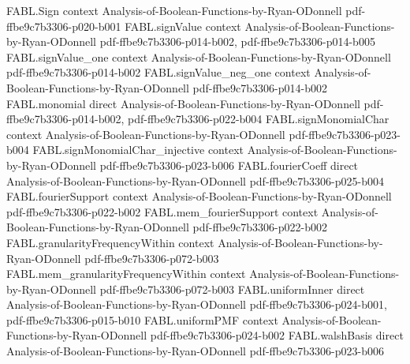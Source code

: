 \begin{theorem}
\label{FABL.correlatedDisagreementProbability_eq}
\leanok
{}
\proofstep
  {FABL.Sign}
  {context}
  {Analysis-of-Boolean-Functions-by-Ryan-ODonnell}
  {pdf-ffbe9c7b3306-p020-b001}
\proofstep
  {FABL.signValue}
  {context}
  {Analysis-of-Boolean-Functions-by-Ryan-ODonnell}
  {pdf-ffbe9c7b3306-p014-b002,
    pdf-ffbe9c7b3306-p014-b005}
\proofstep
  {FABL.signValue_one}
  {context}
  {Analysis-of-Boolean-Functions-by-Ryan-ODonnell}
  {pdf-ffbe9c7b3306-p014-b002}
\proofstep
  {FABL.signValue_neg_one}
  {context}
  {Analysis-of-Boolean-Functions-by-Ryan-ODonnell}
  {pdf-ffbe9c7b3306-p014-b002}
\proofstep
  {FABL.monomial}
  {direct}
  {Analysis-of-Boolean-Functions-by-Ryan-ODonnell}
  {pdf-ffbe9c7b3306-p014-b002,
    pdf-ffbe9c7b3306-p022-b004}
\proofstep
  {FABL.signMonomialChar}
  {context}
  {Analysis-of-Boolean-Functions-by-Ryan-ODonnell}
  {pdf-ffbe9c7b3306-p023-b004}
\proofstep
  {FABL.signMonomialChar_injective}
  {context}
  {Analysis-of-Boolean-Functions-by-Ryan-ODonnell}
  {pdf-ffbe9c7b3306-p023-b006}
\proofstep
  {FABL.fourierCoeff}
  {direct}
  {Analysis-of-Boolean-Functions-by-Ryan-ODonnell}
  {pdf-ffbe9c7b3306-p025-b004}
\proofstep
  {FABL.fourierSupport}
  {context}
  {Analysis-of-Boolean-Functions-by-Ryan-ODonnell}
  {pdf-ffbe9c7b3306-p022-b002}
\proofstep
  {FABL.mem_fourierSupport}
  {context}
  {Analysis-of-Boolean-Functions-by-Ryan-ODonnell}
  {pdf-ffbe9c7b3306-p022-b002}
\proofstep
  {FABL.granularityFrequencyWithin}
  {context}
  {Analysis-of-Boolean-Functions-by-Ryan-ODonnell}
  {pdf-ffbe9c7b3306-p072-b003}
\proofstep
  {FABL.mem_granularityFrequencyWithin}
  {context}
  {Analysis-of-Boolean-Functions-by-Ryan-ODonnell}
  {pdf-ffbe9c7b3306-p072-b003}
\proofstep
  {FABL.uniformInner}
  {direct}
  {Analysis-of-Boolean-Functions-by-Ryan-ODonnell}
  {pdf-ffbe9c7b3306-p024-b001,
    pdf-ffbe9c7b3306-p015-b010}
\proofstep
  {FABL.uniformPMF}
  {context}
  {Analysis-of-Boolean-Functions-by-Ryan-ODonnell}
  {pdf-ffbe9c7b3306-p024-b002}
\proofstep
  {FABL.walshBasis}
  {direct}
  {Analysis-of-Boolean-Functions-by-Ryan-ODonnell}
  {pdf-ffbe9c7b3306-p023-b006}

\end{theorem}
